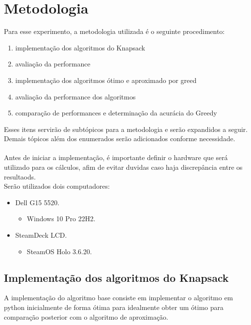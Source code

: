 \documentclass{article}
\begin{document}
\section{Metodologia}
Para esse experimento, a metodologia utilizada é o seguinte procedimento:
\begin{enumerate}
    \item implementação dos algoritmos do Knapsack
    \item avaliação da performance
    \item implementação dos algoritmos ótimo e aproximado por greed
    \item avaliação da performance dos algoritmos
    \item comparação de performances e determinação da acurácia do Greedy
\end{enumerate}
Esses itens servirão de subtópicos para a metodologia e serão expandidos a seguir.\\
Demais tópicos além dos enumerados serão adicionados conforme necessidade.\\
\\
Antes de iniciar a implementação, é importante definir o hardware que será utilizado para os cálculos, afim de evitar duvidas caso haja discrepância entre os resultaods.\\
Serão utilizados dois computadores:
\begin{itemize}
    \item Dell G15 5520.
\begin{itemize}
    \item Windows 10 Pro 22H2.
\end{itemize}
    \item SteamDeck LCD.
\begin{itemize}
    \item SteamOS Holo 3.6.20.
\end{itemize}
\end{itemize}

\subsection{Implementação dos algoritmos do Knapsack}
    A implementação do algoritmo base consiste em implementar o algoritmo em python inicialmente de forma ótima para idealmente obter um ótimo para comparação posterior com o algoritmo de aproximação. 
\end{document}
